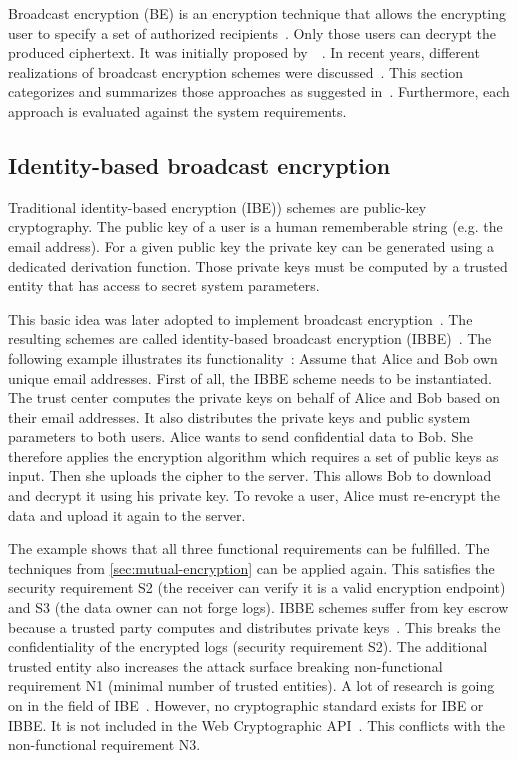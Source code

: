 \documentclass[../main.tex]{subfiles}
\begin{document}
Broadcast encryption (BE) is an encryption technique that allows the encrypting user to specify a set of authorized recipients~\cite{Hagg2022}.
Only those users can decrypt the produced ciphertext.
It was initially proposed by~\citeauthor{fiat1993broadcast}~\cite{fiat1993broadcast}.
In recent years, different realizations of broadcast encryption schemes were discussed~\cite{Sakai2007, Li2018, Hagg2022, Fan2013}.
This section categorizes and summarizes those approaches as suggested in~\cite{Hagg2022}.
Furthermore, each approach is evaluated against the system requirements.

\subsection{Identity-based broadcast encryption} 
\label{sec:broadcast-identity}

Traditional identity-based encryption (IBE)) schemes are public-key cryptography.
The public key of a user is a human rememberable string (e.g. the email address).
For a given public key the private key can be generated using a dedicated derivation function.
Those private keys must be computed by a trusted entity that has access to secret system parameters.~\cite{shamir1985}

This basic idea was later adopted to implement broadcast encryption~\cite{Hagg2022}.
The resulting schemes are called identity-based broadcast encryption (IBBE)~\cite{Sakai2007}.
The following example illustrates its functionality~\cite{Hagg2022}:
Assume that Alice and Bob own unique email addresses.
First of all, the IBBE scheme needs to be instantiated.
The trust center computes the private keys on behalf of Alice and Bob based on their email addresses.
It also distributes the private keys and public system parameters to both users.
Alice wants to send confidential data to Bob.
She therefore applies the encryption algorithm which requires a set of public keys as input.
Then she uploads the cipher to the server.
This allows Bob to download and decrypt it using his private key.
To revoke a user, Alice must re-encrypt the data and upload it again to the server.

The example shows that all three functional requirements can be fulfilled.
The techniques from \cref{sec:mutual-encryption} can be applied again.
This satisfies the security requirement S2 (the receiver can verify it is a valid encryption endpoint) and S3 (the data owner can not forge logs).
IBBE schemes suffer from key escrow because a trusted party computes and distributes private keys~\cite{Hagg2022}.
This breaks the confidentiality of the encrypted logs (security requirement S2).
The additional trusted entity also increases the attack surface breaking non-functional requirement N1 (minimal number of trusted entities).
A lot of research is going on in the field of IBE~\cite{Hagg2022}.
However, no cryptographic standard exists for IBE or IBBE.
It is not included in the Web Cryptographic API~\cite{WebCryptoApi2017}.
This conflicts with the non-functional requirement N3.
\end{document}
